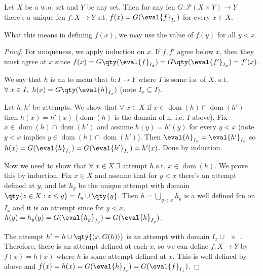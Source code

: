 \begin{theorem}
    Let $X$ be a w.o. set and $Y$ be any set.
    Then for any fcn $G \colon \mathcal{P}(X \times Y) \to Y$ there's a unique fcn $f : X \to Y$ s.t. $f(x) = G(\eval{f}_{I_x})$ for every $x \in X$.
\end{theorem}

\begin{remark}
    What this means in defining $f(x)$, we may use the value of $f(y)$ for all $y < x$.
\end{remark}

\begin{proof}
    For uniqueness, we apply induction on $x$.
    If $f, f'$ agree below $x$, then they must agree at $x$ since $f(x) = G\qty(\eval{f}_{I_x}) = G\qty(\eval{f'}_{I_x}) = f'(x)$.

    We say that $h$ is an  to mean that $h \colon I \to Y$ where $I$ is some i.s. of $X$, s.t. $\forall \; x \in I,\ h(x) = G\qty(\eval{h}_{I_x})$ (note $I_x \subseteq I$).

    Let $h, h'$ be attempts.
    We show that $\forall \; x \in X$ if $x \in \operatorname{dom}(h) \cap \operatorname{dom}(h')$ then $h(x) = h'(x)$ ($\operatorname{dom}(h)$ is the domain of h, i.e. $I$ above).
    Fix $x \in \operatorname{dom}(h) \cap \operatorname{dom}(h')$ and assume $h(y) = h'(y)$ for every $y < x$ (note $y < x$ implies $y \in \operatorname{dom}(h) \cap \operatorname{dom}(h')$).
    Then $\eval{h}_{I_x} = \eval{h'}_{I_x}$ so $h(x) = G(\eval{h}_{I_x}) = G(\eval{h'}_{I_x}) = h'(x)$.
    Done by induction.

    Now we need to show that $\forall \; x \in X \; \exists$ attempt $h$ s.t. $x \in \operatorname{dom}(h)$.
    We prove this by induction.
    Fix $x \in X$ and assume that for $y < x$ there's an attempt defined at $y$, and let $h_y$ be the unique attempt with domain $\qty{z \in X : z \leq y} = I_y \cup \qty{y}$.
    Then $h = \bigcup_{y < x} h_y$ is a well defined fcn on $I_x$ and it is an attempt since for $y < x$, $h(y) = h_y(y) = G(\eval{h_y}_{I_y}) = G(\eval{h}_{I_y})$.

    The attempt $h' = h \cup \qty{(x, G(h))}$ is an attempt with domain $I_x \cup \qty{x}$.
    Therefore, there is an attempt defined at each $x$, so we can define $f \colon X \to Y$ by $f(x) = h(x)$ where $h$ is some attempt defined at $x$.
    This is well defined by above and $f(x) = h(x) = G(\eval{h}_{I_x}) = G(\eval{f}_{I_x})$.
\end{proof}

